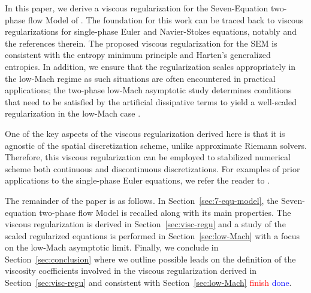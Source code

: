 \documentclass[preprint,10pt]{elsarticle}
\newcommand{\sct}[1]{Section~\ref{#1}}                   %
\newcommand{\tcr}[1]{\textcolor{red}{#1}}
\newcommand{\tcb}[1]{\textcolor{blue}{#1}}
\begin{document}

In this paper, we derive a viscous regularization for the Seven-Equation two-phase flow Model  of \cite{SEM}. The foundation for this work can be traced back to viscous regularizations for single-phase Euler and Navier-Stokes equations, notably \cite{jlg} and the references therein. The proposed viscous regularization for the SEM is consistent with the entropy minimum principle and Harten's generalized entropies. In addition, we ensure that the regularization scales appropriately in the low-Mach regime as such situations are often  encountered in practical applications; the two-phase low-Mach asymptotic study determines conditions that need to be satisfied by the artificial dissipative terms to yield a well-scaled regularization in the low-Mach case \cite{Marco_paper_low_mach}. 

One of the key aspects of the viscous regularization derived here is that it is agnostic of the spatial discretization scheme, unlike approximate Riemann solvers. Therefore, this viscous regularization can be employed to stabilized numerical scheme both continuous and discontinuous discretizations. For examples of prior applications to the single-phase Euler equations, we refer the reader to \cite{jlg, valentin}. 

The remainder of the paper is as follows. In \sct{sec:7-equ-model}, the Seven-equation two-phase flow Model is recalled along with its main properties. The viscous regularization is derived in \sct{sec:visc-regu} and a study of the scaled regularized equations is performed in \sct{sec:low-Mach} with a focus on the low-Mach asymptotic limit. 
Finally, we conclude in \sct{sec:conclusion} where we outline possible leads on the definition of the viscosity coefficients involved in the viscous regularization derived in \sct{sec:visc-regu} and consistent with \sct{sec:low-Mach} \tcr{finish} \tcb{done}.
\end{document}
